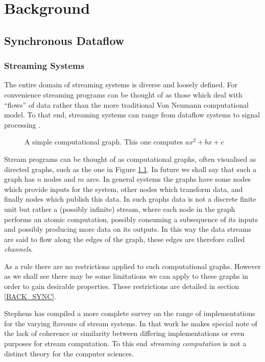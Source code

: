 \chapter{Background}
\label{chapBack}

\section{Synchronous Dataflow}

\subsection{Streaming Systems}
The entire domain of streaming systems is diverse and loosely defined.
For convenience streaming programs can be thought of as those which deal with ``flows'' of data rather than the more traditional Von Neumann computational model.
To that end, streaming systems can range from dataflow systems \cite{gur85} to signal processing \cite{sdfBook}.

\begin{figure}
\begin{center}
	
\caption{A simple computational graph.  This one computes $ax^2 + bx + c$}
\label{figSimpleDG}
\end{center}
\end{figure}

Stream programs can be thought of as computational graphs, often visualised as directed graphs, such as the one in Figure \ref{figSimpleDG}.
In future we shall say that such a graph has $n$ nodes and $m$ arcs.
In general systems the graphs have some nodes which provide inputs for the system, other nodes which transform data, and finally nodes which publish this data.
In such graphs data is not a discrete finite unit but rather a (possibly infinite) stream, where each node in the graph performs an atomic computation, possibly consuming a subsequence of its inputs and possibly producing more data on its outputs.
In this way the data streams are said to flow along the edges of the graph, these edges are therefore called {\em channels}.

As a rule there are no restrictions applied to such computational graphs.
However as we shall see there may be some limitations we can apply to these graphs in order to gain desirable properties.
These restrictions are detailed in section \ref{BACK_SYNC}.

Stephens has compiled a more complete survey \cite{ste97} on the range of implementations for the varying flavours of stream systems.
In that work he makes special note of the lack of coherence or similarity between differing implementations or even purposes for stream computation.
To this end {\em streaming computation} is not a distinct theory for the computer sciences.

